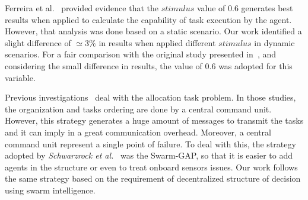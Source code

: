 Ferreira et al.~\citep{ferreira2007swarm} provided evidence that the $stimulus$ value of $0.6$ generates best results when applied to calculate the capability of task execution by the agent. However, that analysis was done based on a static scenario. Our work identified a slight difference of $\simeq 3\%$ in results when applied different $stimulus$ in dynamic scenarios. For a fair comparison with the original study presented in~\citep{MAS07}, and considering the small difference in results, the value of $0.6$ was adopted for this variable.

Previous investigations~\citep{ferreira2007swarm,scerri2005allocatingLADCOP, ferreira2010robocup,ikemoto2010adaptive} deal with the allocation task problem. In those studies, the organization and tasks ordering are done by a central command unit. However, this strategy generates a huge amount of messages to transmit the tasks and it can imply in a great communication overhead. Moreover, a central command unit represent a single point of failure. To deal with this, the strategy adopted by \textit{Schwarzrock et al.}~\citep{MAS07} was the Swarm-GAP, so that it is easier to add agents in the structure or even to treat onboard sensors issues. Our work follows the same strategy based on the requirement of decentralized structure of decision using swarm intelligence.